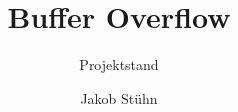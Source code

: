\documentclass[aspectratio=169]{beamer}
\title{Buffer Overflow}
\subtitle{Projektstand}
\author{Jakob Stühn}
\institute{H-BRS}
\begin{document}
\frame{\titlepage}




\end{document}
